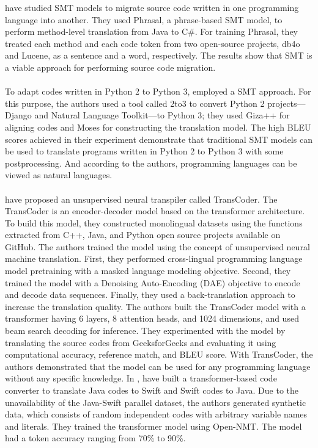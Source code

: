 \textcite{nguyen2013lexical} have studied SMT models to migrate source code written in one programming language into another. They used Phrasal, a phrase-based SMT model, to perform method-level translation from Java to C\#. For training Phrasal, they treated each method and each code token from two open-source projects, db4o and Lucene, as a sentence and a word, respectively. The results show that SMT is a viable approach for performing source code migration.
\\\\
To adapt codes written in Python 2 to Python 3, \textcite{aggarwal2015using} employed a SMT approach. For this purpose, the authors used a tool called 2to3 to convert Python 2 projects—Django and Natural Language Toolkit—to Python 3; they used Giza++ for aligning codes and Moses for constructing the translation model. The high BLEU scores achieved in their experiment demonstrate that traditional SMT models can be used to translate programs written in Python 2 to Python 3 with some postprocessing. And according to the authors, programming languages can be viewed as natural languages.
\\\\
\textcite{lachaux2020unsupervised} have proposed an unsupervised neural transpiler called TransCoder. The TransCoder is an encoder-decoder model based on the transformer architecture. To build this model, they constructed monolingual datasets using the functions extracted from C++, Java, and Python open source projects available on GitHub. The authors trained the model using the concept of unsupervised neural machine translation. First, they performed cross-lingual programming language model pretraining with a masked language modeling objective. Second, they trained the model with a Denoising Auto-Encoding (DAE) objective to encode and decode data sequences. Finally, they used a back-translation approach to increase the translation quality. The authors built the TransCoder model with a transformer having 6 layers, 8 attention heads, and 1024 dimensions, and used beam search decoding for inference. They experimented with the model by translating the source codes from GeeksforGeeks and evaluating it using computational accuracy, reference match, and BLEU score. With TransCoder, the authors demonstrated that the model can be used for any programming language without any specific knowledge.
\newpage
In \cite{hassan2020neural},  \citeauthor{hassan2020neural} have built a transformer-based code converter to translate Java codes to Swift and Swift codes to Java. Due to the unavailability of the Java-Swift parallel dataset, the authors generated synthetic data, which consists of random independent codes with arbitrary variable names and literals. They trained the transformer model using Open-NMT. The model had a token accuracy ranging from 70\% to 90\%.
